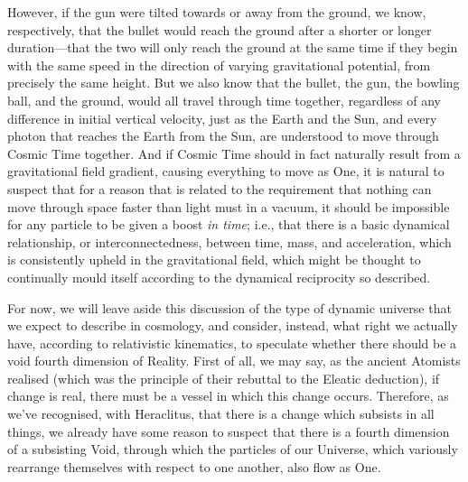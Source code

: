 However, if the gun were tilted towards or away from the ground, we know, respectively, that the bullet would reach the ground after a shorter or longer duration---that the two will only reach the ground at the same time if they begin with the same speed in the direction of varying gravitational potential, from precisely the same height. But we also know that the bullet, the gun, the bowling ball, and the ground, would all travel through time together, regardless of any difference in initial vertical velocity, just as the Earth and the Sun, and every photon that reaches the Earth from the Sun, are understood to move through Cosmic Time together. And if Cosmic Time should in fact naturally result from a gravitational field gradient, causing everything to move as One, it is natural to suspect that for a reason that is related to the requirement that nothing can move through space faster than light must in a vacuum, it should be impossible for any particle to be given a boost \textit{in time}; i.e., that there is a basic dynamical relationship, or interconnectedness, between time, mass, and acceleration, which is consistently upheld in the gravitational field, which might be thought to continually mould itself according to the dynamical reciprocity so described.

For now, we will leave aside this discussion of the type of dynamic universe that we expect to describe in cosmology, and consider, instead, what right we actually have, according to relativistic kinematics, to speculate whether there should be a void fourth dimension of Reality. First of all, we may say, as the ancient Atomists realised (which was the principle of their rebuttal to the Eleatic deduction), if change is real, there must be a vessel in which this change occurs. Therefore, as we've recognised, with Heraclitus, that there is a change which subsists in all things, we already have some reason to suspect that there is a fourth dimension of a subsisting Void, through which the particles of our Universe, which variously rearrange themselves with respect to one another, also flow as One.  

